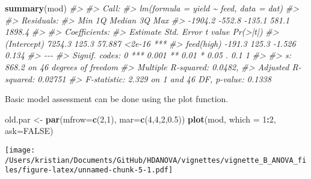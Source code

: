 \documentclass[
]{article}
\newenvironment{Shaded}{\begin{snugshade}}{\end{snugshade}}
\newcommand{\AttributeTok}[1]{\textcolor[rgb]{0.13,0.29,0.53}{#1}}
\newcommand{\CommentTok}[1]{\textcolor[rgb]{0.56,0.35,0.01}{\textit{#1}}}
\newcommand{\ConstantTok}[1]{\textcolor[rgb]{0.56,0.35,0.01}{#1}}
\newcommand{\DecValTok}[1]{\textcolor[rgb]{0.00,0.00,0.81}{#1}}
\newcommand{\FloatTok}[1]{\textcolor[rgb]{0.00,0.00,0.81}{#1}}
\newcommand{\FunctionTok}[1]{\textcolor[rgb]{0.13,0.29,0.53}{\textbf{#1}}}
\newcommand{\NormalTok}[1]{#1}
\newcommand{\OtherTok}[1]{\textcolor[rgb]{0.56,0.35,0.01}{#1}}
\newcommand{\SpecialCharTok}[1]{\textcolor[rgb]{0.81,0.36,0.00}{\textbf{#1}}}
\begin{document}
\begin{Shaded}
\begin{Highlighting}[]
\FunctionTok{summary}\NormalTok{(mod)}
\CommentTok{\#\textgreater{} }
\CommentTok{\#\textgreater{} Call:}
\CommentTok{\#\textgreater{} lm(formula = yield \textasciitilde{} feed, data = dat)}
\CommentTok{\#\textgreater{} }
\CommentTok{\#\textgreater{} Residuals:}
\CommentTok{\#\textgreater{}     Min      1Q  Median      3Q     Max }
\CommentTok{\#\textgreater{} {-}1904.2  {-}552.8  {-}135.1   581.1  1898.4 }
\CommentTok{\#\textgreater{} }
\CommentTok{\#\textgreater{} Coefficients:}
\CommentTok{\#\textgreater{}             Estimate Std. Error t value Pr(\textgreater{}|t|)    }
\CommentTok{\#\textgreater{} (Intercept)   7254.3      125.3  57.887   \textless{}2e{-}16 ***}
\CommentTok{\#\textgreater{} feed(high)    {-}191.3      125.3  {-}1.526    0.134    }
\CommentTok{\#\textgreater{} {-}{-}{-}}
\CommentTok{\#\textgreater{} Signif. codes:  0 \textquotesingle{}***\textquotesingle{} 0.001 \textquotesingle{}**\textquotesingle{} 0.01 \textquotesingle{}*\textquotesingle{} 0.05 \textquotesingle{}.\textquotesingle{} 0.1 \textquotesingle{} \textquotesingle{} 1}
\CommentTok{\#\textgreater{} }
\CommentTok{\#\textgreater{} s: 868.2 on 46 degrees of freedom}
\CommentTok{\#\textgreater{} Multiple R{-}squared: 0.0482,}
\CommentTok{\#\textgreater{} Adjusted R{-}squared: 0.02751 }
\CommentTok{\#\textgreater{} F{-}statistic: 2.329 on 1 and 46 DF,  p{-}value: 0.1338}
\end{Highlighting}
\end{Shaded}

Basic model assessment can be done using the plot function.

\begin{Shaded}
\begin{Highlighting}[]
\NormalTok{old.par }\OtherTok{\textless{}{-}} \FunctionTok{par}\NormalTok{(}\AttributeTok{mfrow=}\FunctionTok{c}\NormalTok{(}\DecValTok{2}\NormalTok{,}\DecValTok{1}\NormalTok{), }\AttributeTok{mar=}\FunctionTok{c}\NormalTok{(}\DecValTok{4}\NormalTok{,}\DecValTok{4}\NormalTok{,}\DecValTok{2}\NormalTok{,}\FloatTok{0.5}\NormalTok{))}
\FunctionTok{plot}\NormalTok{(mod, }\AttributeTok{which =} \DecValTok{1}\SpecialCharTok{:}\DecValTok{2}\NormalTok{, }\AttributeTok{ask=}\ConstantTok{FALSE}\NormalTok{)}
\end{Highlighting}
\end{Shaded}

\texttt{[image: /Users/kristian/Documents/GitHub/HDANOVA/vignettes/vignette\_B\_ANOVA\_files/figure-latex/unnamed-chunk-5-1.pdf]}
\end{document}
